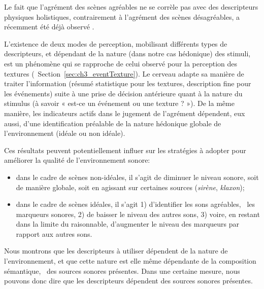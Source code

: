 Le fait que l'agrément des scènes agréables ne se corrèle pas avec des descripteurs physiques holistiques, contrairement à l'agrément des scènes désagréables, a récemment été déjà observé \citep{gozalo2015relationship}.

L'existence de deux modes de perception, mobilisant différents types de descripteurs, et dépendant de la nature (dans notre cas hédonique) des stimuli, est un phénomène qui se rapproche de celui observé pour la perception des textures (\cf~Section~\ref{sec:ch3_eventTexture}). Le cerveau adapte sa manière de traiter l'information (résumé statistique pour les textures, description fine pour les événements) suite à une prise de décision antérieure quant à la nature du stimulus (à savoir « est-ce un événement ou une texture ? »). De la même manière, les indicateurs actifs dans le jugement de l'agrément dépendent, eux aussi, d'une identification préalable de la nature hédonique globale de l'environnement (idéale ou non idéale).

Ces résultats peuvent potentiellement influer sur les stratégies à adopter pour améliorer la qualité de l’environnement sonore:

\begin{itemize}
\item dans le cadre de scènes non-idéales, il s'agit de diminuer le niveau sonore, soit de manière globale, soit en agissant sur certaines sources (\emph{sirène}, \emph{klaxon});
\item dans le cadre de scènes idéales, il s'agit 1) d'identifier les sons agréables, \ie~les marqueurs sonores, 2) de baisser le niveau des autres sons, 3) voire, en restant dans la limite du raisonnable, d'augmenter le niveau des marqueurs par rapport aux autres sons.
\end{itemize}

Nous montrons que les descripteurs à utiliser dépendent de la nature de l'environnement, et que cette nature est elle même dépendante de la composition sémantique, \ie~des sources sonores présentes. Dans une certaine mesure, nous pouvons donc dire que les descripteurs dépendent des sources sonores présentes. 


